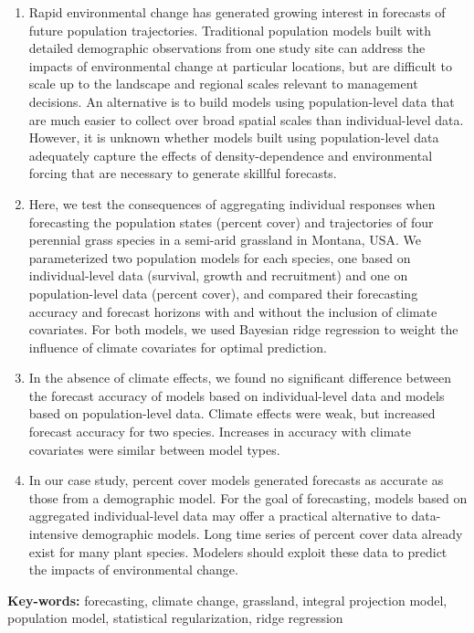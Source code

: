 \documentclass[12pt,]{article}
\begin{document}
\begin{enumerate}[label=\textbf{\arabic*}]
        \item Rapid environmental change has generated growing interest in forecasts of future population trajectories. Traditional population models built with detailed demographic observations from one study site can address the impacts of environmental change at particular locations, but are difficult to scale up to the landscape and regional scales relevant to management decisions. An alternative is to build models using population-level data that are much easier to collect over broad spatial scales than individual-level data.  However, it is unknown whether models built using population-level data adequately capture the effects of density-dependence and environmental forcing that are necessary to generate skillful forecasts.
        \item Here, we test the consequences of aggregating individual responses when forecasting the population states (percent cover) and trajectories of four perennial grass species in a semi-arid grassland in Montana, USA. We parameterized two population models for each species, one based on individual-level data (survival, growth and recruitment) and one on population-level data (percent cover), and compared their forecasting accuracy and forecast horizons with and without the inclusion of climate covariates. For both models, we used Bayesian ridge regression to weight the influence of climate covariates for optimal prediction. 
        \item In the absence of climate effects, we found no significant difference between the forecast accuracy of models based on individual-level data and models based on population-level data. Climate effects were weak, but increased forecast accuracy for two species. Increases in accuracy with climate covariates were similar between model types.
        \item In our case study, percent cover models generated forecasts as accurate as those from a demographic model. For the goal of forecasting, models based on aggregated individual-level data may offer a practical alternative to data-intensive demographic models. Long time series of percent cover data already exist for many plant species. Modelers should exploit these data to predict the impacts of environmental change.
    \end{enumerate}

\textsf{\textbf{Key-words:}} forecasting, climate change, grassland,
integral projection model, population model, statistical regularization,
ridge regression
\end{document}
